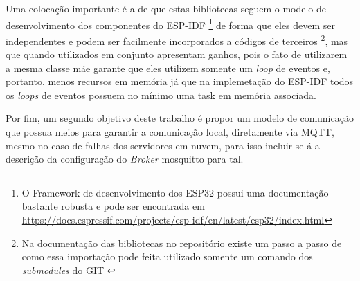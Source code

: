 \newpage
Uma colocação importante é a de que estas bibliotecas seguem o modelo de desenvolvimento dos componentes do \ac{ESP-IDF}
\footnote{O Framework de desenvolvimento dos ESP32 possui uma documentação bastante robusta e pode ser encontrada em 
\url{https://docs.espressif.com/projects/esp-idf/en/latest/esp32/index.html}\cite{esp-idf-docs}}
de forma que eles devem ser independentes e podem ser facilmente incorporados a códigos de terceiros
\footnote{Na documentação das bibliotecas no repositório existe um passo a passo de como essa importação pode feita 
utilizado somente um comando dos \textit{submodules} do GIT \cite{mapl-repo}}, mas que quando utilizados em conjunto 
apresentam ganhos, pois o fato de utilizarem a mesma classe mãe garante que eles utilizem somente um \textit{loop} de 
eventos e, portanto, menos recursos em memória já que na implemetação do \ac{ESP-IDF} todos os \textit{loops} de eventos
possuem no mínimo uma task em memória associada. 

Por fim, um segundo objetivo deste trabalho é propor um modelo de comunicação que possua meios para garantir a comunicação
local, diretamente via \ac{MQTT}, mesmo no caso de falhas dos servidores em nuvem, para isso incluir-se-á a descrição da 
configuração do \textit{Broker} mosquitto para tal.


